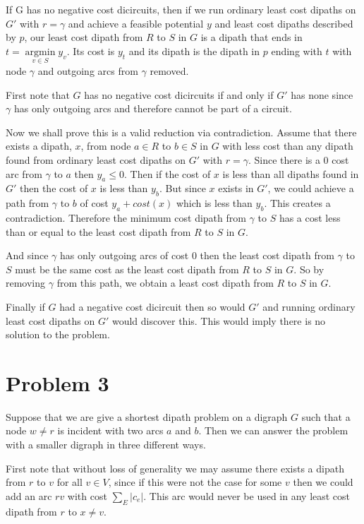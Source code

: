 \documentclass{article}
\DeclareMathOperator*{\argmin}{argmin}
\begin{document}
If G has no negative cost dicircuits, then if we run ordinary least cost dipaths on $G'$ with $r = \gamma$ and achieve a feasible potential $y$ and least cost dipaths
described by 
$p$, our least cost dipath from $R$ to $S$ in $G$ is a dipath that ends in $t = \argmin\limits_{v \in S} y_v$. Its cost is $y_t$ and its dipath is the dipath in $p$ ending with $t$ with node $\gamma$ and outgoing arcs from $\gamma$ removed.

First note that $G$ has no negative cost dicircuits if and only if $G'$ has none since $\gamma$ has only outgoing arcs and therefore cannot be part of a circuit.

Now we shall prove this is a valid reduction via contradiction. Assume that there exists a dipath, $x$, from node $a \in R$ to $b \in S$ in $G$ with less cost than any dipath found from ordinary least cost dipaths on $G'$ with $r=\gamma$. Since there is a 0 cost arc from $\gamma$ to $a$ then $y_a \leq 0$. Then if the cost of $x$ is less than all dipaths found in $G'$ then the cost of $x$ is less than $y_b$. But since $x$ exists in $G'$, we could achieve a path from $\gamma$ to $b$ of cost $y_a + cost(x)$ which is less than $y_b$. This creates a contradiction. Therefore the minimum cost dipath from $\gamma$ to $S$ has a cost less than or equal to the least cost dipath from $R$ to $S$ in $G$. 

And since $\gamma$ has only outgoing arcs of cost $0$ then the least cost dipath from $\gamma$ to $S$ must be the same cost as the least cost dipath from $R$ to $S$ in $G$. So by removing $\gamma$ from this path, we obtain a least cost dipath from $R$ to $S$ in $G$.



Finally if $G$ had a negative cost dicircuit then so would $G'$ and running ordinary least cost dipaths on $G'$ would discover this. This would imply there is no solution to the problem.
 
\section*{Problem 3}
Suppose that we are give a shortest dipath problem on a digraph $G$ such that a node $w\neq r$ is incident with two arcs $a$ and $b$. Then we can answer the problem with a smaller digraph in three different ways. 

First note that without loss of generality we may assume there exists a dipath from $r$ to $v$ for all $v \in V$, since if this were not the case for some $v$ then we could add an arc $rv$ with cost $\sum_E |c_e|$. This arc would never be used in any least cost dipath from $r$ to $x \neq v$.
\end{document}
